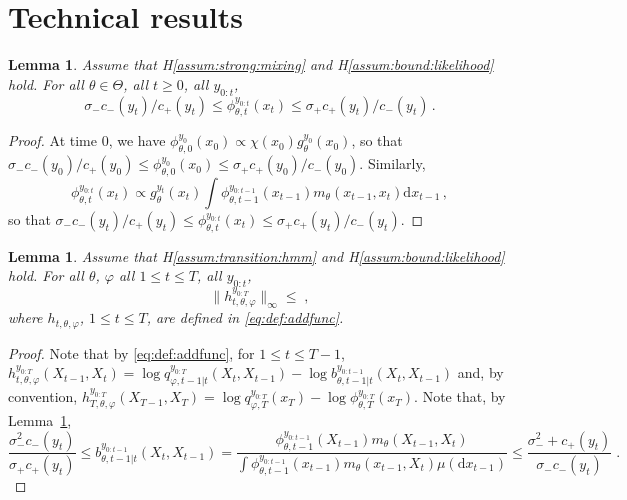 \documentclass{article}
\newtheorem{lemma}[theorem]{Lemma}
\newcommand{\1}{\mathbbm{1}}
\newcommand{\rmd}{\ensuremath{\mathrm{d}}}
\newcommand{\eqsp}{\;}
\begin{document}
\section{Technical results}
\begin{lemma}
\label{lem:bound:filter}
Assume that H\ref{assum:strong:mixing} and H\ref{assum:bound:likelihood} hold. For all $\theta\in\Theta$,  all $t\geq 0$, all $y_{0:t}$,
$$
\sigma_- c_-(y_t)/c_+(y_t)\leq \phi^{y_{0:t}}_{\theta,t}(x_{t})\leq \sigma_+ c_+(y_t)/c_-(y_t)\,.
$$
\end{lemma}
\begin{proof}
At time 0, we have $\phi^{y_{0}}_{\theta,0}(x_{0}) \propto \chi(x_0)g^{y_0}_\theta(x_0)$, so that $\sigma_- c_-(y_0)/c_+(y_0)\leq \phi^{y_{0}}_{\theta,0}(x_{0})\leq \sigma_+ c_+(y_0)/c_-(y_0)$. Similarly, 
$$
\phi^{y_{0:t}}_{\theta,t}(x_{t}) \propto g^{y_t}_\theta(x_t)\int \phi^{y_{0:t-1}}_{\theta,t-1}(x_{t-1})m_\theta(x_{t-1},x_t)\rmd x_{t-1}\,,
$$
so that $\sigma_- c_-(y_t)/c_+(y_t)\leq \phi^{y_{0:t}}_{\theta,t}(x_{t})\leq \sigma_+ c_+(y_t)/c_-(y_t)$.
\end{proof}

\begin{lemma}
\label{lem:bound:addfunc}
Assume that H\ref{assum:transition:hmm} and H\ref{assum:bound:likelihood} hold. For all $\theta$, $\varphi$  all $1\leq t\leq T$, all $y_{0:t}$,
$$
\|h^{y_{0:T}}_{t,\theta,\varphi}\|_\infty \leq \eqsp,
$$
where $h_{t,\theta,\varphi}$, $1\leq t\leq T$,  are defined in \eqref{eq:def:addfunc}.
\end{lemma}
\begin{proof}
Note that by \eqref{eq:def:addfunc}, for $1\leq t \leq T-1$,  $h^{y_{0:T}}_{t,\theta,\varphi}(X_{t-1},X_t) = \log q^{y_{0:T}}_{\varphi,t-1|t}(X_t,X_{t-1}) - \log b^{y_{0:t-1}}_{\theta,t-1|t}(X_t,X_{t-1})$ and, by convention,  $h^{y_{0:T}}_{T,\theta,\varphi}(X_{T-1},X_T) = \log q^{y_{0:T}}_{\varphi,T}(x_T) - \log \phi^{y_{0:T}}_{\theta,T}(x_T)$. Note that, by Lemma~\ref{lem:bound:filter},
$$
\frac{\sigma^2_-c_-(y_t)}{\sigma_+c_+(y_t)}\leq b^{y_{0:t-1}}_{\theta,t-1|t}(X_t,X_{t-1}) = \frac{\phi_{\theta,t-1}^{y_{0:t-1}}(X_{t-1})m_\theta(X_{t-1},X_t)}{\int \phi_{\theta,t-1}^{y_{0:t-1}}(x_{t-1})m_\theta(x_{t-1},X_t)\mu(\rmd x_{t-1})}\leq \frac{\sigma^2_-+c_+(y_t)}{\sigma_-c_-(y_t)}\eqsp.
$$

\end{proof}
\end{document}
